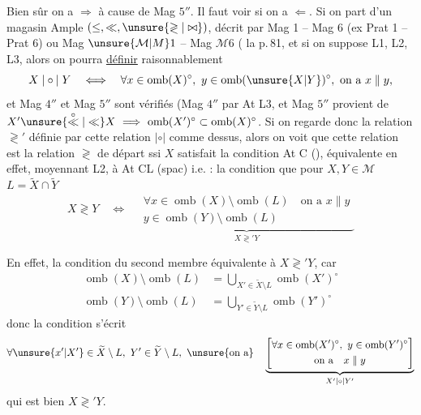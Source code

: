 Bien sûr on a $\Longrightarrow$ à cause de Mag $5''$. Il faut voir si on a $\Longleftarrow$. Si on part d'un magasin Ample $(\leq,\ll,\unsure{\gtrless|\bowtie})$, décrit par Mag 1 -- Mag 6 (ex Prat 1 -- Prat 6) ou Mag $\unsure{\mathcal M|M}1$ -- Mag $\mathcal M6$ ( la p.\,81, et si on suppose  L1, L2, L3, alors on pourra \uline{définir} raisonnablement
\[
X\mathrel{|\circ|}Y\quad\Longleftrightarrow\quad\forall x\in\operatorname{omb}(X)^{\circ},\ y\in\operatorname{omb}(\unsure{X|Y})^{\circ},\ \text{on a }x\parallel y,
\]
et Mag $4''$ et Mag $5''$ sont vérifiés (Mag $4''$  par At L3, et Mag $5''$ provient de $X'\unsure{\overset{\circ}{\ll}|\ll}X\ \Longrightarrow\ \operatorname{omb}(X')^{\circ}\subset\operatorname{omb}(X)^{\circ}$. Si on regarde donc la relation $\gtrless'$ définie par cette relation $\mathrel{|\circ|}$ comme dessus, alors on voit que cette relation est la relation $\gtrless$ de départ ssi $X$ satisfait la condition At C (), équivalente en effet, moyennant L2, à At CL (spac) i.e. : la condition que pour $X,Y\in\mathcal M$ $L=\widetilde X\cap\widetilde Y$
\[
X\gtrless Y\quad\Longleftrightarrow\quad
\underbrace{\begin{gathered}
\forall x\in\operatorname{omb}(X)\setminus\operatorname{omb}(L)\quad\text{on a }x\parallel y\\
y\in\operatorname{omb}(Y)\setminus\operatorname{omb}(L)
\end{gathered}}_{X\gtrless'Y}
\]

En effet, la condition du second membre  équivalente à $X\gtrless'Y$, car
\[
\begin{aligned}
\operatorname{omb}(X)\setminus\operatorname{omb}(L)&=\bigcup_{X'\in\widetilde X\setminus L}\operatorname{omb}(X')^{\circ}\\
\operatorname{omb}(Y)\setminus\operatorname{omb}(L)&=\bigcup_{Y'\in\widetilde Y\setminus L}\operatorname{omb}(Y')^{\circ}
\end{aligned}
\]
donc la condition  s'écrit 
\[
\forall\unsure{x'|X'}\in\widetilde X\setminus L,\ Y'\in\widetilde Y\setminus L,\ \unsure{\text{on a}}\quad
\underbrace{\left[\begin{gathered}
\forall x\in\operatorname{omb}(X')^{\circ},\ y\in\operatorname{omb}(Y')^{\circ}\\
\text{on a}\quad x\parallel y
\end{gathered}\right]}_{X'\mathrel{|\circ|}Y'}
\]
qui est bien $X\gtrless'Y$.
